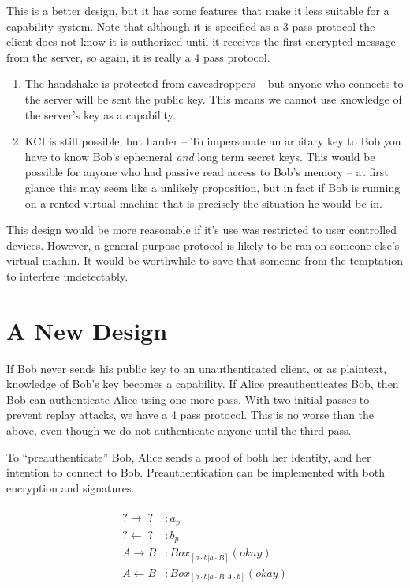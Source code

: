 \documentclass[12pt]{article}
\begin{document}
This is a better design, but it has some features that make it less
suitable for a capability system. Note that although it is 
specified as a 3 pass protocol the client does not know it is authorized
until it receives the first encrypted message from the server,
so again, it is really a 4 pass protocol.

\begin{enumerate}
  \item The handshake is protected from eavesdroppers -- but
  anyone who connects to the server will be sent the public key.
  This means we cannot use knowledge of the server's key as a capability.
  \item KCI is still possible, but harder -- To impersonate an
  arbitary key to Bob you have to know Bob's ephemeral \emph{and} long
  term secret keys. This would be possible for anyone who had
  passive read access to Bob's memory -- at first
  glance this may seem like a unlikely proposition, but in fact
  if Bob is running on a rented virtual machine that
  is precisely the situation he would be in.
\end{enumerate}

This design would be more reasonable if it's use was restricted
to user controlled devices. However, a general purpose protocol
is likely to be ran on someone else's virtual machin. It would
be worthwhile to save that someone from the temptation
to interfere undetectably.

\section{A New Design}

If Bob never sends his public key to an unauthenticated
client, or as plaintext, knowledge of Bob's key becomes a capability.
If Alice preauthenticates Bob, then Bob can authenticate
Alice using one more pass. With two initial passes to prevent
replay attacks, we have a 4 pass protocol. This is no worse
than the above, even though we do not authenticate anyone
until the third pass.

To ``preauthenticate'' Bob, Alice sends a proof of both her identity,
and her intention to connect to Bob. Preauthentication can be
implemented with both encryption and signatures.

$$
\begin{align*}
\\
    ? \to \;?\; &: a_p  \\
    ? \gets \;?\; &: b_p \\
    A \to B &: Box_{[a \cdot b | a \cdot B]}(okay) \\
    A \gets B &: Box_{[a \cdot b | a \cdot B | A \cdot b]}(okay)\\
\\
\end{align*}
$$
\end{document}
